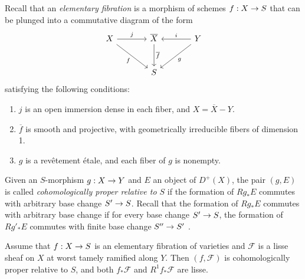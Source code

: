 \documentclass[deligne.tex]{subfiles}
\begin{document}
\subsubsection{}\label{sec:elementary_fibration}
Recall \cite[XI 3.1]{SGAA} that an \emph{elementary fibration} is a morphism
of schemes $f:X\rightarrow S$ that can be plunged into a commutative diagram of the 
form
\begin{equation*}\begin{tikzcd}[row sep=large,column sep=large]
	X\arrow[r,"j"]\arrow[dr,"f"']
	&\overline X\arrow[d,"\overline f"]
	&Y\arrow[l,"i"']\arrow[dl,"g"] \\
	&S
\end{tikzcd}\end{equation*}
satisfying the following conditions:
\begin{enumerate}[label=(\roman*)]
	\item $j$ is an open immersion dense in each fiber, and $X=\overline X-Y$.
	\item $\overline f$ is smooth and projective, with geometrically irreducible fibers of dimension 1.
	\item $g$ is a revêtement étale, and each fiber of $g$ is nonempty.
\end{enumerate}
Given an $S$-morphism $g:X\rightarrow Y$ and $E$ an object of $D^+(X)$, the pair
$(g,E)$ is called \emph{cohomologically proper relative
to $S$} if the formation of $Rg_*E$ commutes with arbitrary base change
$S'\rightarrow S$. Recall that the formation of $Rg_*E$ commutes with arbitrary base
change if for every base change $S'\rightarrow S$, the formation of $Rg'_*E$ 
commutes with finite base change $S''\rightarrow S'$ \cite[1.3]{Illusie}.
\begin{lemma}\label{lem:coh_proper}
	Assume that $f:X\rightarrow S$ is an elementary fibration of varieties and
	$\mathcal F$ is a lisse sheaf on $X$ at worst tamely ramified along $Y$.
	Then $(f,\mathcal F)$ is cohomologically proper relative to $S$, and both
	$f_*\mathcal F$ and $R^1f_*\mathcal F$ are lisse.
\end{lemma}
\end{document}
